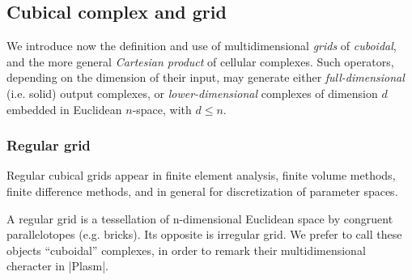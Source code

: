 \subsection{Cubical complex and grid}\label{sect:3-2-2}


We introduce now the definition and use of multidimensional \emph{grids} of \emph{cuboidal}, and the more general \emph{Cartesian product} of cellular complexes. Such operators, depending on the dimension of their input, may generate either \emph{full-dimensional} (i.e. solid) output complexes, or \emph{lower-dimensional} complexes of dimension $d$ embedded in Euclidean $n$-space, with $d\leq n$.  

\subsubsection*{Regular grid}


Regular cubical grids appear in finite element analysis, finite volume methods, finite difference methods, and in general for discretization of parameter spaces. 

\begin{definition} A regular grid is a tessellation of n-dimensional Euclidean space by congruent parallelotopes (e.g. bricks). Its opposite is irregular grid. We prefer to call these objects “cuboidal” complexes, in order to remark their multidimensional cheracter in |Plasm|.
\end{definition}


